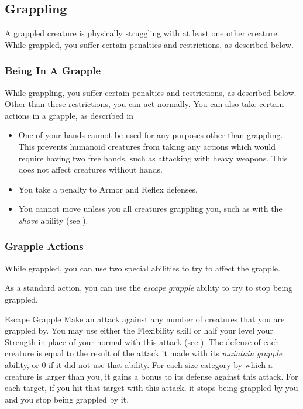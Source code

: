     \subsection{Grappling}\label{Grappling}
        A grappled creature is physically struggling with at least one other creature.
        While grappled, you suffer certain penalties and restrictions, as described below.

        \subsubsection{Being In A Grapple}
            While grappling, you suffer certain penalties and restrictions, as described below. Other than these restrictions, you can act normally. You can also take certain actions in a grapple, as described in 
            \begin{itemize}
                \item One of your hands cannot be used for any purposes other than grappling.
                    This prevents humanoid creatures from taking any actions which would require having two free hands, such as attacking with heavy weapons.
                    This does not affect creatures without hands.
                \item You take a  penalty to Armor and Reflex defenses.
                \item You cannot move unless you  all creatures grappling you, such as with the \textit{shove} ability (see ).
            \end{itemize}

        \subsubsection{Grapple Actions}\label{Grapple Actions}
            While grappled, you can use two special abilities to try to affect the grapple.

            \label{Escape Grapple} As a standard action, you can use the \textit{escape grapple} ability to try to stop being grappled.

            \begin{activeability}{Escape Grapple}
                \rankline
                Make an attack against any number of creatures that you are grappled by.
                You may use either the Flexibility skill or half your level \add your Strength in place of your normal  with this attack (see ).
                The defense of each creature is equal to the result of the attack it made with its \textit{maintain grapple} ability, or 0 if it did not use that ability.
                For each size category by which a creature is larger than you, it gains a  bonus to its defense against this attack.
                For each target, if you hit that target with this attack, it stops being grappled by you and you stop being grappled by it.
            \end{activeability}

